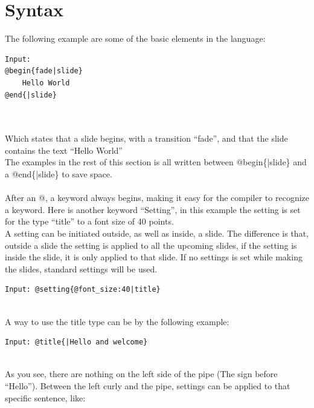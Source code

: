 \section*{Syntax}

The following example are some of the basic elements in the language:
\begin{verbatim}
Input:
@begin{fade|slide}
    Hello World
@end{|slide}
\end{verbatim}

\\ \\
Which states that a slide begins, with a transition ``fade'', and that the slide contains the text ``Hello World'' \\
The examples in the rest of this section is all written between @begin\{|slide\} and a @end\{|slide\} to save space.
\\ \\
After an @, a keyword always begins, making it easy for the compiler to recognize a keyword.
Here is another keyword ``Setting'', in this example the setting is set for the type ``title'' to a font size of 40 points. \\
A setting can be initiated outside, as well as inside, a slide. The difference is that, outside a slide the setting is applied to all the upcoming slides, if the setting is inside the slide, it is only applied to that slide. If no settings is set while making the slides, standard settings will be used.

\begin{verbatim}
Input: @setting{@font_size:40|title}
\end{verbatim}

 \\

A way to use the title type can be by the following example:\\

\begin{verbatim}
Input: @title{|Hello and welcome}
\end{verbatim}

\\

As you see, there are nothing on the left side of the pipe (The sign before ``Hello''). Between the left curly and the pipe, settings can be applied to that specific sentence, like:\\

